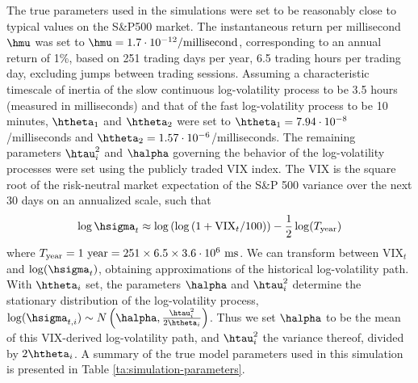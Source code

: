 The true parameters used in the simulations were set to be reasonably close to typical values on the S\&P500 market. The instantaneous return per millisecond $\hmu$ was set to $\hmu = 1.7 \cdot 10^{-12}/\mbox{millisecond}$, corresponding to an annual return of 1\%, based on 251 trading days per year, 6.5 trading hours per trading day, excluding jumps between trading sessions. Assuming a characteristic timescale of inertia of the slow continuous log-volatility process to be 3.5 hours (measured in milliseconds) and that of the fast log-volatility process to be 10 minutes, $\htheta_1$ and $\htheta_2$ were set to $\htheta_1 = 7.94\cdot 10^{-8}$/milliseconds and $\htheta_2 = 1.57\cdot 10^{-6}$/milliseconds. The remaining parameters $\htau_i^2$ and $\halpha$ governing the behavior of the log-volatility processes were set using the publicly traded VIX index. The VIX is the square root of the risk-neutral market expectation of the S\&P 500 variance over the next 30 days on an annualized scale, such that
$$
\log \hsigma_t \approx \log\left( \log\left(1 + \mbox{VIX}_t / 100 \right) \right) - \frac{1}{2} \log(T_{\rm year})
$$
where $T_{\rm year} = 1 \mbox{ year} = 251 \times 6.5 \times 3.6 \cdot 10^6 \mbox{ ms}$. We can transform between $\mbox{VIX}_t$ and $\log(\hsigma_t)$, obtaining approximations of the historical log-volatility path. With $\htheta_i$ set, the parameters $\halpha$ and $\htau_i^2$ determine the stationary distribution of the log-volatility process, $\log(\hsigma_{t,i}) \sim N\left(\halpha, \frac{\htau_i^2}{2\htheta_i}\right)$.  Thus we set $\halpha$ to be the mean of this VIX-derived log-volatility path, and $\htau_i^2$ the variance thereof, divided by $2\htheta_i$.  A summary of the true model parameters used in this simulation is presented in Table \ref{ta:simulation-parameters}.
